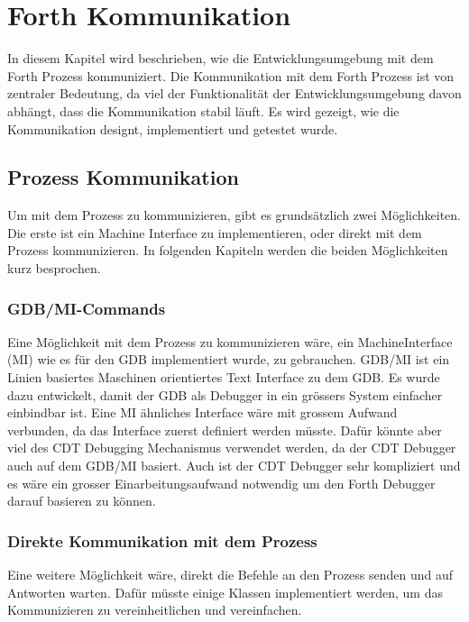\chapter{Forth Kommunikation}
\label{forthcommunication}

In diesem Kapitel wird beschrieben, wie die Entwicklungsumgebung mit dem Forth Prozess kommuniziert. Die Kommunikation mit dem Forth Prozess ist von zentraler Bedeutung, da viel der Funktionalität der Entwicklungsumgebung davon abhängt, dass die Kommunikation stabil läuft. Es wird gezeigt, wie die Kommunikation designt, implementiert und getestet wurde.

\section{Prozess Kommunikation}
Um mit dem Prozess zu kommunizieren, gibt es grundsätzlich zwei Möglichkeiten. Die erste ist ein Machine Interface zu implementieren, oder direkt mit dem Prozess kommunizieren. In folgenden Kapiteln werden die beiden Möglichkeiten kurz besprochen.

\subsection{GDB/MI-Commands}

Eine Möglichkeit mit dem Prozess zu kommunizieren wäre, ein MachineInterface (MI) wie es für den GDB implementiert wurde, zu gebrauchen. GDB/MI ist ein Linien basiertes Maschinen orientiertes Text Interface zu dem GDB. Es wurde dazu entwickelt, damit der GDB als Debugger in ein grössers System einfacher einbindbar ist.\cite{gdb} Eine MI ähnliches Interface wäre mit grossem Aufwand verbunden, da das Interface zuerst definiert werden müsste. Dafür könnte aber viel des CDT Debugging Mechanismus verwendet werden, da der CDT Debugger auch auf dem GDB/MI basiert. Auch ist der CDT Debugger sehr kompliziert\cite{mieclipse} und es wäre ein grosser Einarbeitungsaufwand notwendig um den Forth Debugger darauf basieren zu können.\cite{mieclipse}

\subsection{Direkte Kommunikation mit dem Prozess}

Eine weitere Möglichkeit wäre, direkt die Befehle an den Prozess senden und auf Antworten warten. Dafür müsste einige Klassen implementiert werden, um das Kommunizieren zu vereinheitlichen und vereinfachen.

